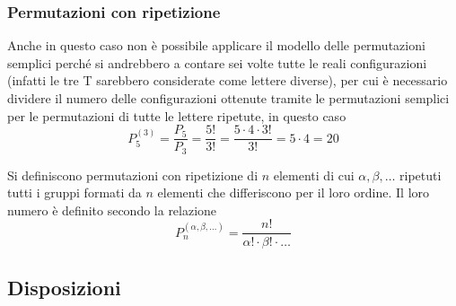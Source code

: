 \documentclass{article}     %
\begin{document}
            \subsubsection{Permutazioni con ripetizione} 
            \begin{ex}
                Anche in questo caso non è possibile applicare il modello delle permutazioni semplici perché si andrebbero a contare sei volte tutte le reali configurazioni (infatti le tre T sarebbero considerate come lettere diverse), per cui è necessario dividere il numero delle configurazioni ottenute tramite le permutazioni semplici per le permutazioni di tutte le lettere ripetute, in questo caso \[P_5^{(3)}=\frac{P_5}{P_3}=\frac{5!}{3!}=\frac{5\cdot4\cdot3!}{3!}=5\cdot4=20\]
            \end{ex}
            \begin{boxdef}
                Si definiscono permutazioni con ripetizione di $n$ elementi di cui $\alpha, \beta, \dots$ ripetuti tutti i gruppi formati da $n$ elementi che differiscono per il loro ordine. Il loro numero è definito secondo la relazione \[P_n^{(\alpha, \beta, \dots)}=\frac{n!}{\alpha! \cdot \beta! \cdot \dots}\]
            \end{boxdef}
            
            \subsection{Disposizioni}
\end{document}
